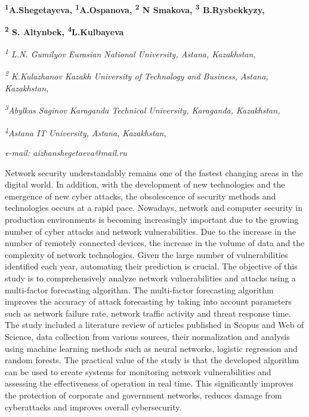{\bfseries \textsuperscript{1}A.Shegetayeva\textsuperscript{\envelope },
\textsuperscript{1}A.Ospanova, \textsuperscript{2} N Smakova,
\textsuperscript{3} B.Rysbekkyzy,}

{\bfseries \textsuperscript{2} S. Altynbek, \textsuperscript{4}L.Kulbayeva}

\emph{\textsuperscript{1} L.N. Gumilyov Eurasian National University,
Astana, Kazakhstan,}

\emph{\textsuperscript{2} K.Kulazhanov Kazakh University of Technology
and Business, Astana, Kazakhstan,}

\emph{\textsuperscript{3}Abylkas Saginov Karaganda Technical University,
Karaganda, Kazakhstan,}

\emph{\textsuperscript{4}Astana IT University, Astana, Kazakhstan,}

\emph{e-mail: aizhanshegetaeva@mail.ru}

Network security understandably remains one of the fastest changing
areas in the digital world. In addition, with the development of new
technologies and the emergence of new cyber attacks, the obsolescence of
security methods and technologies occurs at a rapid pace. Nowadays,
network and computer security in production environments is becoming
increasingly important due to the growing number of cyber attacks and
network vulnerabilities. Due to the increase in the number of remotely
connected devices, the increase in the volume of data and the complexity
of network technologies. Given the large number of vulnerabilities
identified each year, automating their prediction is crucial. The
objective of this study is to comprehensively analyze network
vulnerabilities and attacks using a multi-factor forecasting algorithm.
The multi-factor forecasting algorithm improves the accuracy of attack
forecasting by taking into account parameters such as network failure
rate, network traffic activity and threat response time. The study
included a literature review of articles published in Scopus and Web of
Science, data collection from various sources, their normalization and
analysis using machine learning methods such as neural networks,
logistic regression and random forests. The practical value of the study
is that the developed algorithm can be used to create systems for
monitoring network vulnerabilities and assessing the effectiveness of
operation in real time. This significantly improves the protection of
corporate and government networks, reduces damage from cyberattacks and
improves overall cybersecurity.

